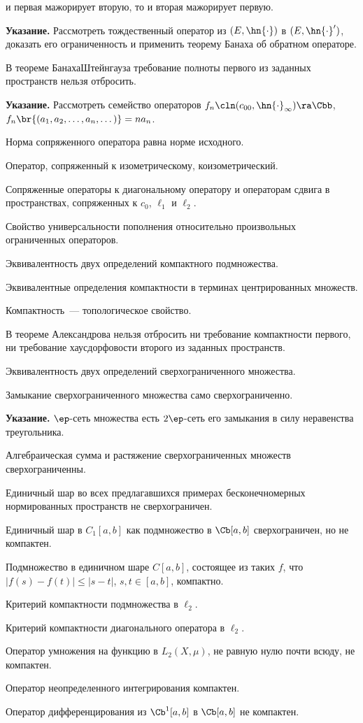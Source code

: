 \documentclass[a4paper]{article}
\def\apoint{\par\textbf{Указание.} }
\begin{document}
\begin{nums}{-1}
и первая мажорирует вторую, то и вторая мажорирует первую. \apoint Рассмотреть тождественный
оператор из $(E,\hn{\cdot})$ в $(E,\hn{\cdot}')$, доказать его ограниченность и применить теорему
Банаха об обратном операторе.
\item В теореме Банаха\ч Штейнгауза требование полноты первого из заданных пространств нельзя отбросить.
\apoint Рассмотреть семейство операторов $f_n\cln(c_{00},\hn{\cdot}_\infty)\ra\Cbb$,
$f_n\br{(a_1,a_2,\dots,a_n,\dots)}=na_n$.
\item Норма сопряженного оператора равна норме исходного.
\item Оператор, сопряженный к изометрическому, коизометрический.
\item Сопряженные операторы к диагональному оператору и операторам сдвига в пространствах, сопряженных
к $c_0$, $\ell_1$ и $\ell_2$.
\item Свойство универсальности пополнения относительно произвольных ограниченных операторов.
\item Эквивалентность двух определений компактного подмножества.
\item Эквивалентные определения компактности в терминах центрированных множеств.
\item Компактность~--- топологическое свойство.
\item В теореме Александрова нельзя отбросить ни требование компактности
первого, ни требование хаусдорфовости второго из заданных пространств.
\item Эквивалентность двух определений сверхограниченного множества.
\item Замыкание сверхограниченного множества само сверхограниченно.
\apoint $\ep$-сеть множества есть $2\ep$-сеть его замыкания в силу неравенства треугольника.
\item Алгебраическая сумма и растяжение сверхограниченных множеств сверхограниченны.
\item Единичный шар во всех предлагавшихся примерах бесконечномерных нормированных пространств
не сверх\-ограничен.
\item Единичный шар в $C_1[a,b]$ как подмножество в $\Cb[a,b]$ сверхограничен, но не компактен.
\item Подмножество в единичном шаре $C[a,b]$, состоящее из таких $f$, что
$|f(s)-f(t)|\leqslant|s-t|$, $s,t\in[a,b]$, компактно.
\item Критерий компактности подмножества в $\ell_2$.
\item Критерий компактности диагонального оператора в $\ell_2$.
\item Оператор умножения на функцию в $L_2(X,\mu)$, не равную нулю почти всюду, не компактен.
\item Оператор неопределенного интегрирования компактен.
\item Оператор дифференцирования из $\Cb^1[a,b]$ в $\Cb[a,b]$ не компактен.
\end{nums}
\end{document}
